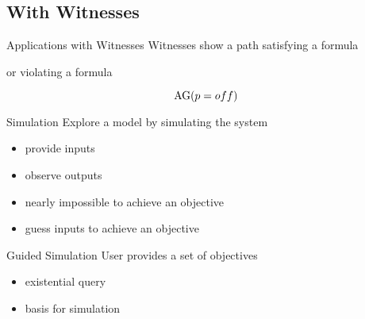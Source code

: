 \subsection{With Witnesses} 

\begin{frame}{Applications with Witnesses}
  Witnesses show a path satisfying a formula
  
  \vfill
  
  or violating a formula
  
  \[ \operatorname{AG} (p = off) \]
\end{frame}

\begin{frame}[plain]
  \vfill

  \begin{center}
  \end{center}

  \vfill
\end{frame}

\begin{frame}{Simulation}
  Explore a model by simulating the system
  \begin{itemize}
    \item provide inputs 
    \item observe outputs
  \end{itemize}

  \vfill

  \begin{itemize}
    \item nearly impossible to achieve an objective
    \item guess inputs to achieve an objective
  \end{itemize}
\end{frame}

\begin{frame}{Guided Simulation}
  User provides a set of objectives
  \begin{itemize}
    \item existential query
    \item basis for simulation
  \end{itemize}
\end{frame}

